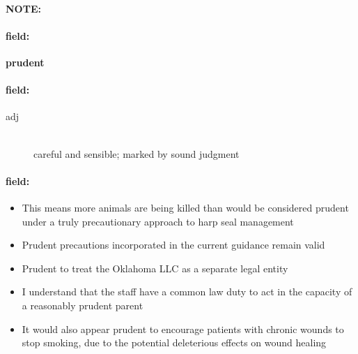 \documentclass[12pt]{article}
\newenvironment{note}{\paragraph{NOTE:}}{}
\newenvironment{field}{\paragraph{field:}}{}
\begin{document}
\begin{note}
\begin{field}
\textbf{\large prudent}
\end{field}


\begin{field}
\begin{description}
\item[adj] \hfill \\ 
careful and sensible; marked by sound judgment

\end{description}
\end{field}

\begin{field}
\begin{itemize}
\item This means more animals are being killed than would be considered prudent under a truly precautionary approach to harp seal management
\item Prudent precautions incorporated in the current guidance remain valid 
\item Prudent to treat the Oklahoma LLC as a separate legal entity
\item I understand that the staff have a common law duty to act in the capacity of a reasonably prudent parent
\item It would also appear prudent to encourage patients with chronic wounds to stop smoking, due to the potential deleterious effects on wound healing
\end{itemize}
\end{field}
\end{note}
\end{document}
